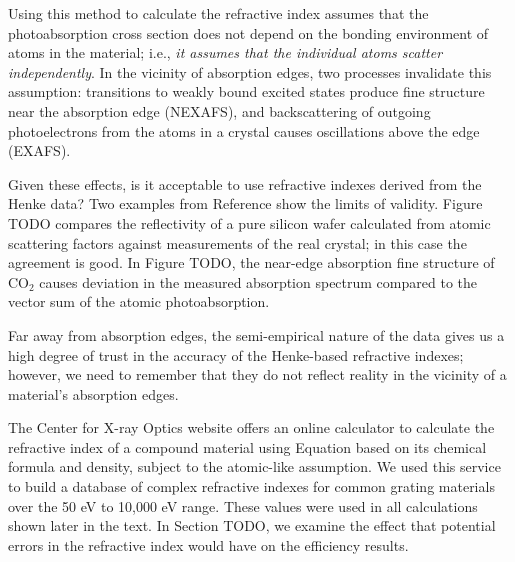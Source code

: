 Using this method to calculate the refractive index assumes that the photoabsorption cross section does not depend on the bonding environment of atoms in the material; i.e., \emph{it assumes that the individual atoms scatter independently}.  In the vicinity of absorption edges, two processes invalidate this assumption: transitions to weakly bound excited states produce fine structure near the absorption edge (NEXAFS), and backscattering of outgoing photoelectrons from the atoms in a crystal causes oscillations above the edge (EXAFS).

Given these effects, is it acceptable to use refractive indexes derived from the Henke data?  Two examples from Reference \cite{Hen93} show the limits of validity.  Figure TODO compares the reflectivity of a pure silicon wafer calculated from atomic scattering factors against measurements of the real crystal; in this case the agreement is good.  In Figure TODO, the near-edge absorption fine structure of CO$_2$ causes deviation in the measured absorption spectrum compared to the vector sum of the atomic photoabsorption.

Far away from absorption edges, the semi-empirical nature of the data gives us a high degree of trust in the accuracy of the Henke-based refractive indexes; however, we need to remember that they do not reflect reality in the vicinity of a material's absorption edges.

The Center for X-ray Optics website \cite{CXR11} offers an online calculator to calculate the refractive index of a compound material using Equation  based on its chemical formula and density, subject to the atomic-like assumption.  We used this service to build a database of complex refractive indexes for common grating materials over the 50 eV to 10,000 eV range.  These values were used in all calculations shown later in the text.  In Section TODO, we examine the effect that potential errors in the refractive index would have on the efficiency results.
